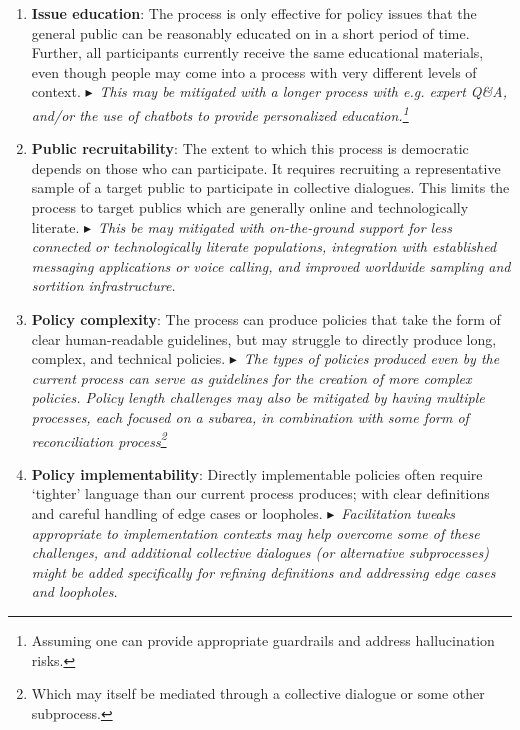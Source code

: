 \documentclass{article}
\begin{document}
\begin{enumerate}
    \item 

\textbf{Issue education}: The process is only effective for policy issues that the general public can be reasonably educated on in a short period of time. Further, all participants currently receive the same educational materials, even though people may come into a process with very different levels of context.  $\blacktriangleright$~\emph{This may be mitigated with a longer process with e.g. expert Q\&A, and/or the use of chatbots to provide personalized education.\footnote{Assuming one can provide appropriate guardrails and address hallucination risks.}}

\item 
\textbf{Public recruitability}: The extent to which this process is democratic depends on those who can participate. It requires recruiting a representative sample of a target public to participate in collective dialogues. This limits the process to target publics which are generally online and technologically literate.  $\blacktriangleright$~\emph{This be may mitigated with on-the-ground support for less connected or technologically literate populations, integration with established messaging applications or voice calling, and improved worldwide sampling and sortition infrastructure.}

\item 
\textbf{Policy complexity}: The process can produce policies that take the form of clear human-readable guidelines, but may struggle to directly produce long, complex, and technical policies.
$\blacktriangleright$~\emph{The types of policies produced even by the current process can serve as guidelines for the creation of more complex policies. Policy length challenges may also be mitigated by having multiple processes, each focused on a subarea, in combination with some form of reconciliation process\footnote{Which may itself be mediated through a collective dialogue or some other subprocess.}}

\item 
\textbf{Policy implementability}: Directly implementable policies often require `tighter' language than our current process produces; with clear definitions and careful handling of edge cases or loopholes.
$\blacktriangleright$~\emph{Facilitation tweaks appropriate to implementation contexts may help overcome some of these challenges, and additional collective dialogues (or alternative subprocesses) might be added specifically for refining definitions and addressing edge cases and loopholes.}


\end{enumerate}
\end{document}
